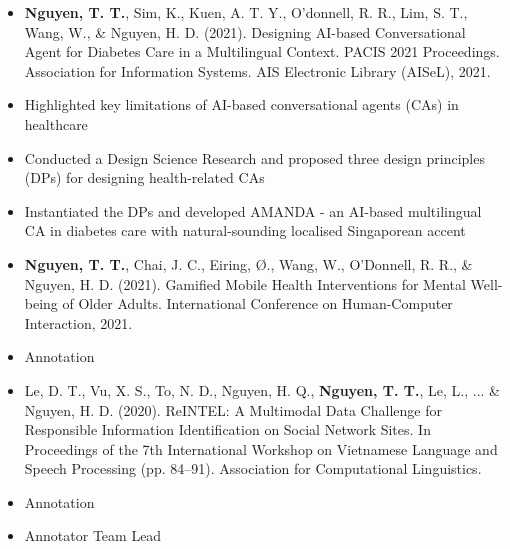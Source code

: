 \documentclass[10pt,a4paper,ragged2e]{altacv}
\begin{document}
\begin{paracol}{2}
\begin{itemize}
	\item \textbf{Nguyen, T. T.}, Sim, K., Kuen, A. T. Y., O'donnell, R. R., Lim, S. T., Wang, W., \& Nguyen, H. D. (2021). Designing AI-based Conversational Agent for Diabetes Care in a Multilingual Context. PACIS 2021 Proceedings. Association for Information Systems. AIS Electronic Library (AISeL), 2021.
	\item Highlighted key limitations of AI-based conversational agents (CAs) in healthcare
	\item Conducted a Design Science Research and proposed three design principles (DPs) for designing health-related CAs
	\item Instantiated the DPs and developed AMANDA - an AI-based multilingual CA in diabetes care with natural-sounding localised Singaporean accent
\end{itemize}

\begin{itemize}
	\item \textbf{Nguyen, T. T.}, Chai, J. C., Eiring, Ø., Wang, W., O’Donnell, R. R., \& Nguyen, H. D. (2021). Gamified Mobile Health Interventions for Mental Well-being of Older Adults. International Conference on Human-Computer Interaction, 2021.
	\item Annotation
\end{itemize}

\begin{itemize}
	\item Le, D. T., Vu, X. S., To, N. D., Nguyen, H. Q., \textbf{Nguyen, T. T.}, Le, L., ... \& Nguyen, H. D. (2020). ReINTEL: A Multimodal Data Challenge for Responsible Information Identification on Social Network Sites. In Proceedings of the 7th International Workshop on Vietnamese Language and Speech Processing (pp. 84–91). Association for Computational Linguistics.
	\item Annotation
	\item Annotator Team Lead
\end{itemize}

\end{paracol}
\end{document}
